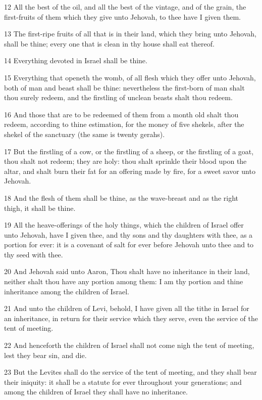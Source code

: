 \par 12 All the best of the oil, and all the best of the vintage, and of the grain, the first-fruits of them which they give unto Jehovah, to thee have I given them.
\par 13 The first-ripe fruits of all that is in their land, which they bring unto Jehovah, shall be thine; every one that is clean in thy house shall eat thereof.
\par 14 Everything devoted in Israel shall be thine.
\par 15 Everything that openeth the womb, of all flesh which they offer unto Jehovah, both of man and beast shall be thine: nevertheless the first-born of man shalt thou surely redeem, and the firstling of unclean beasts shalt thou redeem.
\par 16 And those that are to be redeemed of them from a month old shalt thou redeem, according to thine estimation, for the money of five shekels, after the shekel of the sanctuary (the same is twenty gerahs).
\par 17 But the firstling of a cow, or the firstling of a sheep, or the firstling of a goat, thou shalt not redeem; they are holy: thou shalt sprinkle their blood upon the altar, and shalt burn their fat for an offering made by fire, for a sweet savor unto Jehovah.
\par 18 And the flesh of them shall be thine, as the wave-breast and as the right thigh, it shall be thine.
\par 19 All the heave-offerings of the holy things, which the children of Israel offer unto Jehovah, have I given thee, and thy sons and thy daughters with thee, as a portion for ever: it is a covenant of salt for ever before Jehovah unto thee and to thy seed with thee.
\par 20 And Jehovah said unto Aaron, Thou shalt have no inheritance in their land, neither shalt thou have any portion among them: I am thy portion and thine inheritance among the children of Israel.
\par 21 And unto the children of Levi, behold, I have given all the tithe in Israel for an inheritance, in return for their service which they serve, even the service of the tent of meeting.
\par 22 And henceforth the children of Israel shall not come nigh the tent of meeting, lest they bear sin, and die.
\par 23 But the Levites shall do the service of the tent of meeting, and they shall bear their iniquity: it shall be a statute for ever throughout your generations; and among the children of Israel they shall have no inheritance.
